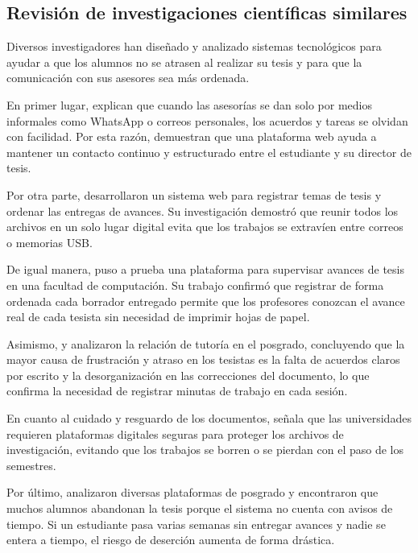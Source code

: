 \subsection{Revisión de investigaciones científicas similares}
\label{subsec:investigaciones_cientificas}

Diversos investigadores han diseñado y analizado sistemas tecnológicos para ayudar a que los alumnos no se atrasen al realizar su tesis y para que la comunicación con sus asesores sea más ordenada.

En primer lugar, \textcite{sim2023technology} explican que cuando las asesorías se dan solo por medios informales como WhatsApp o correos personales, los acuerdos y tareas se olvidan con facilidad. Por esta razón, demuestran que una plataforma web ayuda a mantener un contacto continuo y estructurado entre el estudiante y su director de tesis.

Por otra parte, \textcite{ali2024thesis} desarrollaron un sistema web para registrar temas de tesis y ordenar las entregas de avances. Su investigación demostró que reunir todos los archivos en un solo lugar digital evita que los trabajos se extravíen entre correos o memorias USB.

De igual manera, \textcite{sayeh2021web} puso a prueba una plataforma para supervisar avances de tesis en una facultad de computación. Su trabajo confirmó que registrar de forma ordenada cada borrador entregado permite que los profesores conozcan el avance real de cada tesista sin necesidad de imprimir hojas de papel.

Asimismo, \textcite{bitchener2014supervising} y \textcite{lee2012successful} analizaron la relación de tutoría en el posgrado, concluyendo que la mayor causa de frustración y atraso en los tesistas es la falta de acuerdos claros por escrito y la desorganización en las correcciones del documento, lo que confirma la necesidad de registrar minutas de trabajo en cada sesión.

En cuanto al cuidado y resguardo de los documentos, \textcite{mebtouche2025national} señala que las universidades requieren plataformas digitales seguras para proteger los archivos de investigación, evitando que los trabajos se borren o se pierdan con el paso de los semestres.

Por último, \textcite{lando2025digital} analizaron diversas plataformas de posgrado y encontraron que muchos alumnos abandonan la tesis porque el sistema no cuenta con avisos de tiempo. Si un estudiante pasa varias semanas sin entregar avances y nadie se entera a tiempo, el riesgo de deserción aumenta de forma drástica.

